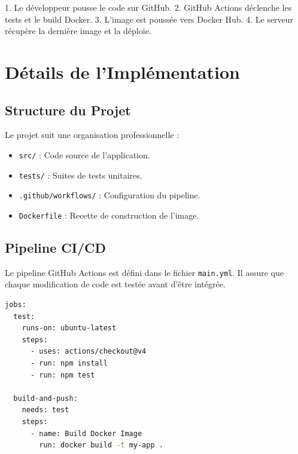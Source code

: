 \documentclass[12pt,a4paper]{report}
\begin{document}
\begin{center}
\end{center}

1. Le développeur pousse le code sur GitHub.
2. GitHub Actions déclenche les tests et le build Docker.
3. L'image est poussée vers Docker Hub.
4. Le serveur récupère la dernière image et la déploie.

\chapter{Détails de l'Implémentation}

\section{Structure du Projet}
Le projet suit une organisation professionnelle :
\begin{itemize}
    \item \texttt{src/} : Code source de l'application.
    \item \texttt{tests/} : Suites de tests unitaires.
    \item \texttt{.github/workflows/} : Configuration du pipeline.
    \item \texttt{Dockerfile} : Recette de construction de l'image.
\end{itemize}

\section{Pipeline CI/CD}
Le pipeline GitHub Actions est défini dans le fichier \texttt{main.yml}. Il assure que chaque modification de code est testée avant d'être intégrée.

\begin{lstlisting}[language=bash, caption=Extrait du pipeline GitHub Actions]
jobs:
  test:
    runs-on: ubuntu-latest
    steps:
      - uses: actions/checkout@v4
      - run: npm install
      - run: npm test

  build-and-push:
    needs: test
    steps:
      - name: Build Docker Image
        run: docker build -t my-app .
\end{lstlisting}
\end{document}
